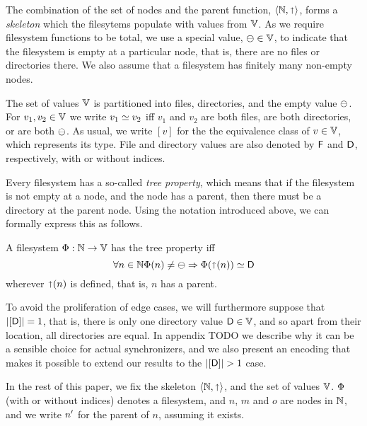 The combination of the set of nodes and the parent function,
$\langle \mathbb{N}, \mathord{\shortuparrow} \rangle$, forms a \emph{skeleton}
which the filesytems populate with values from $\mathbb{V}$.
As we require filesystem functions to be total,
we use a special value, $\ominus\in\mathbb{V}$, to indicate that the filesystem
is empty at a particular node, that is, there are no files or directories there.
We also assume that a filesystem has finitely many non-empty nodes.

\begin{mydef}
The set of values $\mathbb{V}$ is partitioned into files, directories, and the empty value $\ominus$.
For $v_1,v_2\in\mathbb{V}$ we write $v_1\simeq v_2$ iff
$v_1$ and $v_2$ are both files, are both directories, or are both $\ominus$.
As usual, we write $[v]$ for the the equivalence class of $v\in\mathbb{V}$, which represents its type.
File and directory values are also denoted by $\mathsf{F}$ and $\mathsf{D}$, respectively,
with or without indices.
\end{mydef}


Every filesystem has a so-called \emph{tree property}, which means that
if the filesystem is not empty at a node, and the node has a parent,
then there must be a directory at the parent node.
Using the notation introduced above, we can formally express this as follows.
\begin{mydef}
A filesystem $\Phi:\mathbb{N} \rightarrow \mathbb{V}$ has the tree property iff
\[ \forall n\in\mathbb{N}
\Phi(n) \neq \ominus \Rightarrow \Phi(\mathord{\shortuparrow}(n)) \simeq \mathsf{D} \]
wherever $\mathord{\shortuparrow}(n)$ is defined, that is, $n$ has a parent.
\end{mydef}


To avoid the proliferation of edge cases, we will furthermore suppose that
$|[\mathsf{D}]|=1$, that is, there is only one directory value $\mathsf{D}\in\mathbb{V}$, and so
apart from their location, all directories are equal.
In appendix TODO we describe why it can be a sensible choice
for actual synchronizers, and we also present an encoding that makes it possible
to extend our results to the $|\setd|>1$ case.



\bigskip
In the rest of this paper,
we fix the skeleton $\langle\mathbb{N},\mathord{\shortuparrow}\rangle$,
and the set of values $\mathbb{V}$.
$\Phi$ (with or without indices) denotes a filesystem,
and $n$, $m$ and $o$ are nodes in $\mathbb{N}$,
and we write $n'$ for the parent of $n$, assuming it exists.
